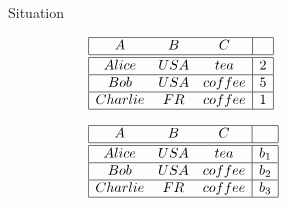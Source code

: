 \documentclass[11pt]{beamer}
\begin{document}
\begin{frame}{Situation}

\begin{figure}
\begin{subfigure}{0.45\textwidth}
$\begin{array}{| c  c  c |  c |}
            \hline
            A & B & C &  \\
            \hline 
            \hline
            Alice & USA & tea & 2 \\
            \hline
            Bob & USA & coffee & 5 \\
            \hline
            Charlie & FR & coffee & 1 \\
            \hline
        \end{array}$
\end{subfigure}
\begin{subfigure}{0.45\textwidth}
$\begin{array}{| c  c  c |  c |}
            \hline
            A & B & C &  \\
            \hline 
            \hline
            Alice & USA & tea & b_1 \\
            \hline
            Bob & USA & coffee & b_2 \\
            \hline
            Charlie & FR & coffee & b_3 \\
            \hline
        \end{array}$
\end{subfigure}
\end{figure}

\begin{tiny}


\end{tiny}
\end{frame}
\end{document}
